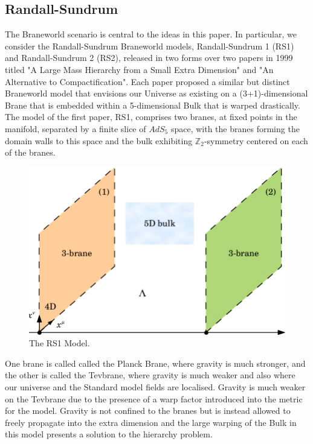 \documentclass[11pt]{report}
\numberwithin{equation}{chapter}
\begin{document}
\subsection{Randall-Sundrum}
The Braneworld scenario is central to the ideas in this paper. In particular, we consider the Randall-Sundrum Braneworld models, Randall-Sundrum 1 (RS1) and Randall-Sundrum 2 (RS2), released in two forms over two papers in 1999 titled "A Large Mass Hierarchy from a Small Extra Dimension"\cite{RS2} and "An Alternative to Compactification"\cite{RS1}. Each paper proposed a similar but distinct Braneworld model that envisions our Universe as existing on a (3+1)-dimensional Brane that is embedded within a 5-dimensional Bulk that is warped drastically. The model of the first paper, RS1, comprises two branes, at fixed points in the manifold, separated by a finite slice of $AdS_5$ space, with the branes forming the domain walls to this space and the bulk exhibiting $\mathbb{Z}_2$-symmetry centered on each of the branes.

\begin{figure}[h]
\centering
    \includegraphics[scale=0.25]{Images/RS1.png}
    \caption{The RS1 Model\cite{RS1Diagram}.}
    \label{fig:RS1}
\end{figure}
One brane is called called the Planck Brane, where gravity is much stronger, and the other is called the Tevbrane, where gravity is much weaker and also where our universe and the Standard model fields are localised. Gravity is much weaker on the Tevbrane due to the presence of a warp factor introduced into the metric for the model. Gravity is not confined to the branes but is instead allowed to freely propagate into the extra dimension and the large warping of the Bulk in this model presents a solution to the hierarchy problem.
\end{document}
